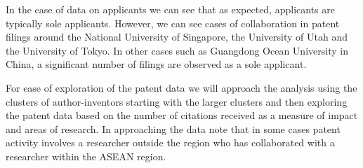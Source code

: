 \documentclass[]{book}
\theoremstyle{definition}
\theoremstyle{definition}
\theoremstyle{definition}
\theoremstyle{remark}
\begin{document}
In the case of data on applicants we can see that as expected,
applicants are typically sole applicants. However, we can see cases of
collaboration in patent filings around the National University of
Singapore, the University of Utah and the University of Tokyo. In other
cases such as Guangdong Ocean University in China, a significant number
of filings are observed as a sole applicant.

For ease of exploration of the patent data we will approach the analysis
using the clusters of author-inventors starting with the larger clusters
and then exploring the patent data based on the number of citations
received as a measure of impact and areas of research. In approaching
the data note that in some cases patent activity involves a researcher
outside the region who has collaborated with a researcher within the
ASEAN region.
\end{document}
